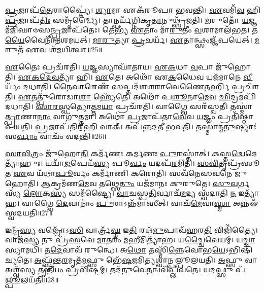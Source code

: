 \-\ul{𑌪𑍍𑌰}\-𑌜𑌾𑌪᳴\-\ul{𑌤𑍇}\-𑌰𑌾𑌪𑍍𑌤𑍍𑌯𑍈॑।
\-\ul{𑌶𑍍𑌯𑌾}\-𑌮𑌾 𑌏𑌕᳴𑌰𑍂𑌪𑌾 𑌭𑌵𑌨𑍍𑌤𑌿।
\-\ul{𑌏}\-𑌵𑌮𑌿᳴\-\ul{𑌵} 𑌹𑌿 \ul{𑌪𑍍𑌰}\-𑌜𑌾\-𑌪᳴\-\ul{𑌤𑌿𑌃} 𑌸𑌮𑍃᳴𑌦𑍍𑌧𑍍𑌯𑍈।
𑌤𑌾𑌨𑍍𑌪𑌰𑍍𑌯᳴𑌗𑍍𑌨𑌿𑌕𑍃\-\ul{𑌤𑌾}\-𑌨𑍁𑌥𑍍𑌸𑍃᳴𑌜𑌤𑌿।
\-\ul{𑌮}\-𑌰𑍁𑌤𑍋᳴ \ul{𑌯}\-𑌜𑍍𑌞𑌮᳴𑌜𑌿𑌘𑌾𑍞𑌸\-\ul{𑌨𑍍𑌪𑍍𑌰}\-𑌜𑌾𑌪᳴𑌤𑍇𑌃।
𑌤𑍇𑌭𑍍𑌯᳴ \ul{𑌏}\-𑌤𑌾𑌂 𑌮𑌾᳴\-\ul{𑌰𑍁}\-𑌤𑍀𑌂 \ul{𑌵}\-𑌶𑌾𑌮𑌾𑌲᳴𑌭𑌤।
𑌤\-\ul{𑌯𑍈}\-𑌵𑍈𑌨𑌾᳴𑌨𑌶𑌮𑌯𑌤𑍍।
\-\ul{𑌮𑌾}\-\-\ul{𑌰𑍁}\-𑌤𑍍𑌯𑌾 \ul{𑌪𑍍𑌰}\-𑌚𑌰𑍍𑌯᳴।
\-\ul{𑌏}\-𑌤𑌾𑌨𑍍𑌥𑍍𑌸𑌂𑌜𑍍𑌞᳴𑌪𑌯𑍇𑌤𑍍।
\-\ul{𑌮}\-𑌰𑍁𑌤᳴ \ul{𑌏}\-𑌵 𑌶᳴𑌮\-\ul{𑌯𑌿}\-𑌤𑍍𑌵𑌾॥25॥

\-\ul{𑌏}\-𑌤𑍈𑌃 𑌪𑍍𑌰𑌚᳴𑌰𑌤𑌿।
\-\ul{𑌯}\-𑌜𑍍𑌞𑌸𑍍𑌯𑌾𑌘𑌾᳴𑌤𑌾𑌯।
\-\ul{𑌏}\-\-\ul{𑌕}\-𑌧𑌾 \ul{𑌵}\-𑌪𑌾 𑌜𑍁᳴𑌹𑍋𑌤𑌿।
\-\ul{𑌏}\-\-\ul{𑌕}\-\-\ul{𑌦𑍇}\-\-\ul{𑌵}\-𑌤𑍍𑌯𑌾᳴ 𑌹𑌿।
\-\ul{𑌏}\-𑌤𑍇।
𑌅𑌥𑍋᳴ 𑌏\-\ul{𑌕}\-𑌧𑍈𑌵 𑌯𑌜᳴𑌮𑌾𑌨𑍇 \ul{𑌵𑍀}\-𑌰𑍍𑌯𑌂᳴ 𑌦𑌧𑌾𑌤𑌿।
\-\ul{𑌨𑍈}\-\-\ul{𑌵𑌾}\-𑌰𑍇𑌣᳴ \ul{𑌸}\-𑌪𑍍𑌤𑌦᳴𑌶𑌶𑌰𑌾𑌵𑍇\-\ul{𑌣𑍈}\-𑌤𑌰𑍍\mbox{}\-\ul{𑌹𑌿} 𑌪𑍍𑌰𑌚᳴𑌰𑌤𑌿।
\-\ul{𑌏}\-𑌤𑌤𑍍𑌪𑍁᳴𑌰𑍋𑌡𑌾\-\ul{𑌶𑌾} 𑌹𑍍𑌯𑍇᳴𑌤𑍇।
𑌅𑌥𑍋᳴ 𑌪\-\ul{𑌶𑍂}\-𑌨𑌾\-\ul{𑌮𑍇}\-𑌵 \ul{𑌛𑌿}\-𑌦𑍍𑌰𑌮𑌪𑌿᳴𑌦𑌧𑌾𑌤𑌿।
\-\ul{𑌸𑌾}\-\-\ul{𑌰}\-\-\ul{𑌸𑍍𑌵}\-𑌤𑍍𑌯𑍋\-\ul{𑌤𑍍𑌤}\-𑌮\-\ul{𑌯𑌾} 𑌪𑍍𑌰𑌚᳴𑌰𑌤𑌿।
𑌵𑌾𑌗𑍍𑌵𑍈 𑌸𑌰᳴𑌸𑍍𑌵𑌤𑍀।
𑌤𑌸𑍍𑌮𑌾॑\-\ul{𑌤𑍍𑌪𑍍𑌰𑌾}\-𑌣𑌾\-\ul{𑌨𑌾𑌂} 𑌵𑌾𑌗𑍁᳴\-\ul{𑌤𑍍𑌤}\-𑌮𑌾।
𑌅𑌥𑍋॑ \ul{𑌪𑍍𑌰}\-𑌜𑌾𑌪᳴𑌤𑌾\-\ul{𑌵𑍇}\-𑌵 \ul{𑌯}\-𑌜𑍍𑌞𑌂 𑌪𑍍𑌰𑌤𑌿᳴\-𑌷𑍍𑌠𑌾𑌪𑌯𑌤𑌿।
\-\ul{𑌪𑍍𑌰}\-𑌜𑌾𑌪᳴\-\ul{𑌤𑌿}\-𑌰𑍍‌॒\mbox{}𑌹𑌿 𑌵𑌾𑌕𑍍।
𑌅𑌪᳴𑌨𑍍𑌨𑌦𑌤𑍀 𑌭𑌵𑌤𑌿।
𑌤𑌸𑍍𑌮𑌾॑𑌨𑍍𑌮\-\ul{𑌨𑍁}\-𑌷𑍍𑌯𑌾𑌃॑ 𑌸\-\ul{𑌰𑍍𑌵𑌾𑌂} 𑌵𑌾𑌚𑌂᳴ 𑌵𑌦𑌨𑍍𑌤𑌿॥26॥\anuvakamend[\-\ul{𑌅}\-\-\ul{𑌤𑌿}\-\-\ul{𑌰𑌾}\-𑌤𑍍𑌰\-\ul{𑌮}\-𑌨𑍍𑌤𑌰𑌿᳴𑌕𑍍𑌷\-\ul{𑌮𑍁}\-𑌕𑍍𑌥𑍍𑌯𑍇᳴𑌨 \ul{𑌪𑍍𑌰}\-𑌜𑌾\-𑌪᳴𑌤𑌿𑌃 𑌶𑌮\-\ul{𑌯𑌿}\-𑌤𑍍𑌵𑍋\-\ul{𑌤𑍍𑌤}\-𑌮\-\ul{𑌯𑌾} 𑌪𑍍𑌰𑌚᳴𑌰\-\ul{𑌤𑌿} 𑌷𑌟𑍍 𑌚᳴]

\-\ul{𑌸𑌾}\-\-\ul{𑌵𑌿}\-𑌤𑍍𑌰𑌂 𑌜𑍁᳴𑌹𑍋\-\ul{𑌤𑌿} 𑌕𑌰𑍍𑌮᳴𑌣𑌃 𑌕𑌰𑍍𑌮𑌣𑌃 \ul{𑌪𑍁}\-𑌰𑌸𑍍𑌤𑌾॑𑌤𑍍।
𑌕𑌸𑍍𑌤\-\ul{𑌦𑍍𑌵𑍇}\-𑌦𑍇𑌤𑍍𑌯𑌾᳴𑌹𑍁𑌃।
𑌯𑌦𑍍𑌵𑌾᳴\-\ul{𑌜}\-𑌪𑍇𑌯᳴\-\ul{𑌸𑍍𑌯} 𑌪𑍂\-\ul{𑌰𑍍𑌵𑌂} 𑌯𑌦𑌪᳴\-\ul{𑌰}\-𑌮𑌿𑌤𑌿᳴।
\-\ul{𑌸}\-\-\ul{𑌵𑌿}\-𑌤𑍃𑌪𑍍𑌰᳴𑌸𑍂𑌤 \ul{𑌏}\-𑌵 𑌯᳴𑌥𑌾\-\ul{𑌪𑍂}\-𑌰𑍍𑌵𑌂 𑌕𑌰𑍍𑌮𑌾᳴𑌣𑌿 𑌕𑌰𑍋𑌤𑌿।
𑌸𑌵᳴𑌨𑍇𑌸𑌵𑌨𑍇 𑌜𑍁𑌹𑍋𑌤𑌿।
\-\ul{𑌆}\-𑌕𑍍𑌰𑌮᳴𑌣\-\ul{𑌮𑍇}\-𑌵 𑌤𑌥𑍍𑌸𑍇\-\ul{𑌤𑍁𑌂} 𑌯𑌜᳴𑌮𑌾𑌨𑌃 𑌕𑍁𑌰𑍁𑌤𑍇।
\-\ul{𑌸𑍁}\-\-\ul{𑌵}\-𑌰𑍍𑌗𑌸𑍍𑌯᳴ \ul{𑌲𑍋}\-𑌕\-\ul{𑌸𑍍𑌯} 𑌸𑌮᳴𑌷𑍍𑌟𑍍𑌯𑍈।
\-\ul{𑌵𑌾}\-𑌚𑌸𑍍𑌪\-\ul{𑌤𑌿}\-𑌰𑍍𑌵𑌾𑌚᳴\-\ul{𑌮}\-𑌦𑍍𑌯 𑌸𑍍𑌵᳴𑌦𑌾𑌤𑌿 \ul{𑌨} 𑌇𑌤𑍍𑌯𑌾᳴𑌹।
𑌵𑌾𑌗𑍍𑌵𑍈 \ul{𑌦𑍇}\-𑌵𑌾𑌨𑌾𑌂॑ \ul{𑌪𑍁}\-𑌰𑌾\-𑌽𑌨𑍍𑌨᳴𑌮𑌾𑌸𑍀𑌤𑍍।
𑌵𑌾𑌚᳴\-\ul{𑌮𑍇}\-𑌵𑌾\-\ul{𑌸𑍍𑌮𑌾} 𑌅𑌨𑍍𑌨𑍟᳴ 𑌸𑍍𑌵𑌦𑌯𑌤𑌿॥27॥

𑌇𑌨𑍍𑌦𑍍𑌰᳴\-\ul{𑌸𑍍𑌯} 𑌵𑌜𑍍𑌰𑍋᳴𑌽\-\ul{𑌸𑌿} 𑌵𑌾𑌰𑍍𑌤𑍍𑌰᳴\-\ul{𑌘𑍍𑌨} 𑌇\-\ul{𑌤𑌿} 𑌰𑌥᳴\-\ul{𑌮𑍁}\-𑌪𑌾𑌵᳴𑌹𑌰\-\ul{𑌤𑌿} 𑌵𑌿𑌜𑌿᳴𑌤𑍍𑌯𑍈।
𑌵𑌾𑌜᳴\-\ul{𑌸𑍍𑌯} 𑌨𑍁 𑌪𑍍𑌰᳴\-\ul{𑌸}\-𑌵𑍇 \ul{𑌮𑌾}\-𑌤𑌰𑌂᳴ \ul{𑌮}\-𑌹𑍀𑌮𑌿𑌤𑍍𑌯𑌾᳴𑌹।
𑌯\-\ul{𑌚𑍍𑌚𑍈}\-𑌵𑍇𑌯𑌮𑍍।
𑌯\-\ul{𑌚𑍍𑌚𑌾}\-𑌸𑍍𑌯𑌾𑌮𑌧𑌿᳴।
𑌤\-\ul{𑌦𑍇}\-𑌵𑌾𑌵᳴ 𑌰𑍁𑌨𑍍𑌧𑍇।
𑌅\-\ul{𑌥𑍋} 𑌤𑌸𑍍𑌮𑌿᳴\-\ul{𑌨𑍍𑌨𑍇}\-𑌵𑍋𑌭\-\ul{𑌯𑍇}\-\-𑌽𑌭𑌿\-𑌷𑌿᳴𑌚𑍍𑌯𑌤𑍇।
\-\ul{𑌅}\-𑌫𑍍𑌸𑍍𑌵᳴𑌨𑍍𑌤\-\ul{𑌰}\-𑌮𑍃𑌤᳴\-\-\ul{𑌮}\-𑌫𑍍𑌸𑍁 𑌭𑍇᳴\-\ul{𑌷}\-𑌜𑌮𑌿𑌤𑍍𑌯𑌶𑍍𑌵𑌾॑𑌨𑍍𑌪𑌲𑍍𑌪𑍂𑌲𑌯𑌤𑌿।
\-\ul{𑌅}\-𑌫𑍍𑌸𑍁 𑌵𑌾 𑌅𑌶𑍍𑌵᳴\-\ul{𑌸𑍍𑌯} 𑌤𑍃𑌤𑍀᳴\-\ul{𑌯𑌂} 𑌪𑍍𑌰𑌵𑌿᳴𑌷𑍍𑌟𑌮𑍍।
𑌤𑌦᳴\-\ul{𑌨𑍁}\-𑌵𑍇\-\ul{𑌨}\-𑌨𑍍𑌵𑌵᳴𑌪𑍍𑌲𑌵𑌤𑍇।
𑌯\-\ul{𑌦}\-𑌫𑍍𑌸𑍁 𑌪᳴\-\ul{𑌲𑍍𑌪𑍂}\-𑌲𑌯᳴𑌤𑌿॥28॥

